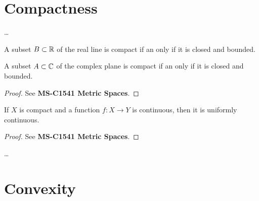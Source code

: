 \section{Compactness}

\begin{definition}[Compactness]
  \label{def:compact}
  \ldots
\end{definition}

\begin{theorem}
  \label{thm:bolzano_weierstrass}
  A subset $B \subset \mathbb{R}$ of the real line is compact
  if an only if it is closed and bounded.

  A subset $A \subset \mathbb{C}$ of the complex plane is compact
  if an only if it is closed and bounded.
\end{theorem}
\begin{proof}
  See \textbf{MS-C1541 Metric Spaces}.
\end{proof}

\begin{lemma}
  \label{lem:on_compact_continuous_implies_uniformly_continuous}
  \lean{}
  If $X$ is compact and a function $f \colon X \to Y$ is continuous, then it is uniformly continuous.
\end{lemma}
\begin{proof}
  See \textbf{MS-C1541 Metric Spaces}.
\end{proof}

\begin{theorem}
  \label{thm:intersect_nested_compacts}
  \lean{}
  \ldots
\end{theorem}

\section{Convexity}
